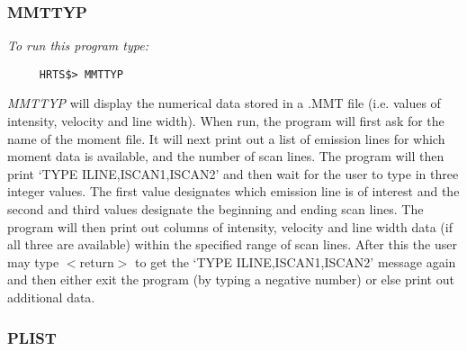 \subsubsection{MMTTYP}

{\em To run this program type:}
\begin{verbatim}
     HRTS$> MMTTYP
\end{verbatim}
  {\em MMTTYP} will display the numerical data stored in a .MMT file (i.e.
   values of intensity, velocity and line width).  When run, the program
   will first ask for the name of the moment file.  It will next print out
   a list of emission lines for which moment data is available, and the
   number of scan lines.  The program will then print `TYPE
   ILINE,ISCAN1,ISCAN2' and then wait for the user to type in three
   integer values.  The first value designates which emission line is of
   interest and the second and third values designate the beginning and
   ending scan lines.  The program will then print out columns of
   intensity, velocity and line width data (if all three are available)
   within the specified range of scan lines.  After this the user may type
   $<$return$>$ to get the `TYPE ILINE,ISCAN1,ISCAN2' message again and then
   either exit the program (by typing a negative number) or else print out
   additional data.

\subsubsection{PLIST}

